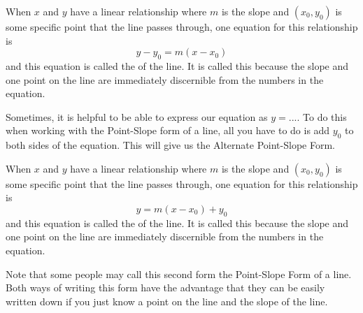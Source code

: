 \documentclass[nooutcomes]{ximera}
\begin{document}
\begin{definition}
When $x$ and  $y$ have a linear relationship where $m$ is the slope and $(x_0,y_0)$ is some specific point that the line passes through, one equation for this relationship is 
$$y-y_0=m(x-x_0)$$ 
and this equation is called the  of the line. It is called this because the slope and one point on the line are immediately discernible from the numbers in the equation.

\begin{image}
\end{image}

\end{definition}


Sometimes, it is helpful to be able to express our equation as $y=...$.  To do this when working with the Point-Slope form of a line, all you have to do is add $y_0$ to both sides of the equation.  This will give us the Alternate Point-Slope Form.  


\begin{definition}
When $x$ and  $y$ have a linear relationship where $m$ is the slope and $(x_0,y_0)$ is some specific point that the line passes through, one equation for this relationship is 
$$y=m(x-x_0)+y_0$$ 
and this equation is called the  of the line. It is called this because the slope and one point on the line are immediately discernible from the numbers in the equation.
\end{definition}


Note that some people may call this second form the Point-Slope Form of a line.  Both ways of writing this form have the advantage that they can be easily written down if you just know a point on the line and the slope of the line.

\end{document}
